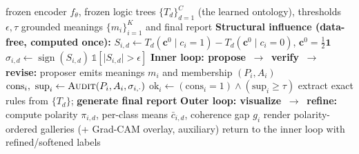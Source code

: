 \begin{algorithm}[t]
\caption{Human/LLM-in-the-loop grounding of emergent OCBM concepts.}
\label{alg:loop}
\begin{algorithmic}[1]
\Require frozen encoder $f_\theta$, frozen logic trees $\{T_d\}_{d=1}^{C}$
         (the learned ontology), thresholds $\epsilon,\tau$
\Ensure grounded meanings $\{m_i\}_{i=1}^{K}$ and final report
\Statex \textbf{Structural influence (data-free, computed once):}
  \State $S_{i,d}\gets T_d(\mathbf{c}^0\!\mid c_i{=}1)-T_d(\mathbf{c}^0\!\mid c_i{=}0)$,
         \quad $\mathbf{c}^0=\tfrac12\mathbf{1}$
  \State $\sigma_{i,d}\gets \operatorname{sign}(S_{i,d})\,\mathbb{1}[\lvert S_{i,d}\rvert>\epsilon]$
\EndFor
\Statex \textbf{Inner loop: propose \,$\to$\, verify \,$\to$\, revise:}
\Repeat
  \State proposer emits meanings $m_i$ and membership $(P_i,A_i)$ 
   
    \State $\mathrm{cons}_i,\ \mathrm{sup}_i \gets \textsc{Audit}(P_i,A_i,\sigma_{i,\cdot})$
    \State $\mathrm{ok}_i \gets (\mathrm{cons}_i{=}1)\wedge(\mathrm{sup}_i\ge\tau)$
  \EndFor
{} 
\State extract exact rules from $\{T_d\}$; \textbf{generate final report} 
\Statex \textbf{Outer loop: visualize \,$\to$\, refine:}
 
  \State compute polarity $\pi_{i,d}$, per-class means $\bar c_{i,d}$, coherence gap $g_i$
  \State render polarity-ordered galleries (+ Grad-CAM overlay, auxiliary)
\EndFor
{}
  \State return to the inner loop with refined/softened labels
\EndIf
\end{algorithmic}
\end{algorithm}